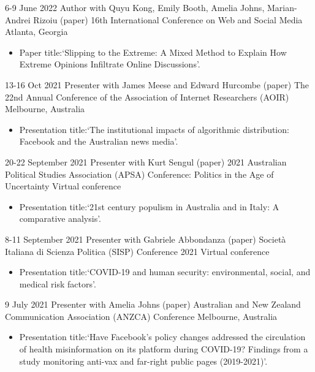 \documentclass[12pt,a4paper,sans]{moderncv}
\begin{document}
\cventry %
{6-9 June 2022}
{Author with Quyu Kong, Emily Booth, Amelia Johns, Marian-Andrei Rizoiu (paper)}
{16th International Conference on Web and Social Media}
{Atlanta, Georgia}
{}
       {
      \begin{itemize} %
        \item {Paper title:`Slipping to the {Extreme}: {A} {Mixed} {Method} to {Explain} {How} {Extreme} {Opinions} {Infiltrate} {Online} {Discussions}'.}
      \end{itemize}
    }
    
\cventry %
{13-16 Oct 2021}
{Presenter with James Meese and Edward Hurcombe (paper)}
{The 22nd Annual Conference of the Association of Internet Researchers
  (AOIR)}
{Melbourne, Australia}
{}
       {
      \begin{itemize} %
        \item {Presentation title:`The institutional impacts of algorithmic distribution: Facebook and the Australian news media'.}
      \end{itemize}
    }

\cventry %
{20-22 September 2021}
{Presenter with Kurt Sengul (paper)}
{2021 Australian Political Studies Association (APSA) Conference: Politics in the Age of Uncertainty}
{Virtual conference}
{}
       {
      \begin{itemize} %
        \item {Presentation title:`21st century populism in Australia and in Italy: A comparative analysis'.}
      \end{itemize}
    }

 \cventry
    {8-11 September 2021}
    {Presenter with Gabriele Abbondanza (paper)}
    {Società Italiana di Scienza Politica (SISP) Conference 2021}
    {Virtual conference}{}
       {
      \begin{itemize} %
        \item {Presentation title:`COVID-19 and human security: environmental, social, and medical risk factors'.}
      \end{itemize}
    }


\cventry %
{9 July 2021}
{Presenter with Amelia Johns (paper)}
{Australian and New Zealand Communication Association (ANZCA) Conference}
{Melbourne, Australia}
{}
       {
      \begin{itemize} %
        \item {Presentation title:`Have Facebook's policy changes
            addressed the circulation of health misinformation on its
            platform during COVID-19? Findings from a study monitoring
            anti-vax and far-right public pages (2019-2021)'.}
      \end{itemize}
    }
\end{document}
